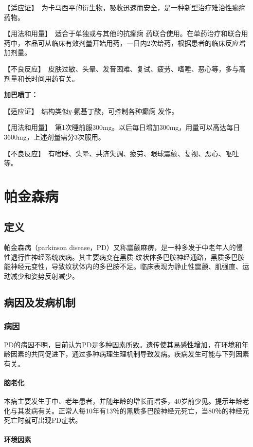 【适应证】　为卡马西平的衍生物，吸收迅速而安全，是一种新型治疗难治性癫痫
药物。

【用法和用量】　适合于单独或与其他的抗癫痫
药联合使用。在单药治疗和联合用药中，本品可从临床有效剂量开始用药，一日内2次给药，根据患者的临床反应增加剂量。

【不良反应】　皮肤过敏、头晕、发音困难、复试、疲劳、嗜睡、恶心等，多与高剂量和长时间用药有关。

\textbf{加巴喷丁：}

【适应证】　结构类似γ-氨基丁酸，可控制各种癫痫
发作。

【用法和用量】　第1次睡前服300mg。以后每日增加300mg，用量可以高达每日3600mg，上述剂量需分3次服用。

【不良反应】　有嗜睡、头晕、共济失调、疲劳、眼球震颤、复视、恶心、呕吐等。

\section{帕金森病}

\subsection{定义}

帕金森病（parkinson
disease，PD）又称震颤麻痹，是一种多发于中老年人的慢性退行性神经系统疾病。其主要病变在黑质-纹状体多巴胺神经通路，黑质多巴胺能神经元变性，导致纹状体内的多巴胺不足。临床表现为静止性震颤、肌强直、运动减少和姿势反射减少。

\subsection{病因及发病机制}

\subsubsection{病因}

PD的病因不明，目前认为PD是多种因素所致。遗传使其易感性增加，在环境和年龄因素的共同促进下，通过多种病理生理机制导致发病。疾病发生可能与下列因素有关。
\paragraph{脑老化}

本病主要发生于中、老年患者，并随年龄的增长而增多，40岁前少见。提示年龄老化与其发病有关。正常人每10年有13％的黑质多巴胺神经元死亡，当80％的神经元死亡时就可出现PD症状。
\paragraph{环境因素}

